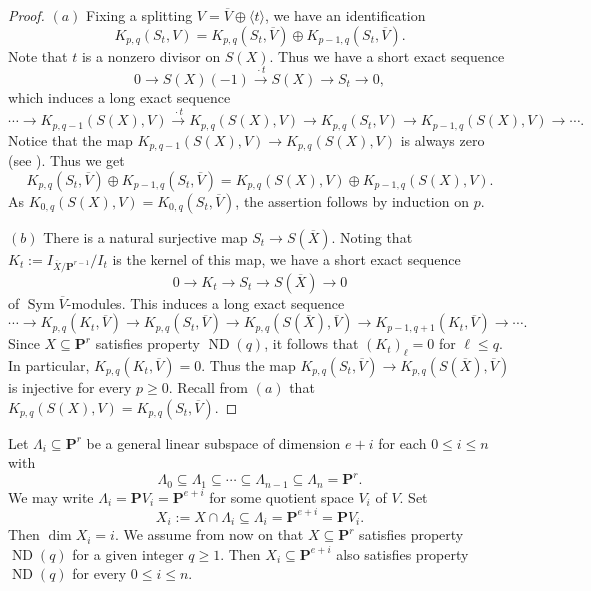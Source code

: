 \documentclass[12pt]{amsart}
\theoremstyle{definition}
\theoremstyle{remark}
\theoremstyle{corollary}
\theoremstyle{theorem}
\theoremstyle{corollary}
\theoremstyle{corollary}
\theoremstyle{definition}
\theoremstyle{remark}
\numberwithin{equation}{section}
\def\nP{\mathbf{P}}
\def\Sym{\operatorname{Sym}}
\DeclareMathOperator{\ND}{ND}
\begin{document}
\begin{proof}
$(a)$ Fixing a splitting $V = \overline{V} \oplus \langle t \rangle$, we have an identification
$$
K_{p,q}(S_t, V) = K_{p,q}(S_t, \overline{V}) \oplus K_{p-1,q}(S_t, \overline{V}).
$$
Note that $t$ is a nonzero divisor on $S(X)$. Thus we have a short exact sequence
$$
0 \longrightarrow S(X)(-1) \xrightarrow{~\cdot t~} S(X) \longrightarrow S_t \longrightarrow 0,
$$
which induces a long exact sequence
$$
\cdots \longrightarrow K_{p,q-1}(S(X), V) \xrightarrow{~\cdot t~} K_{p,q}(S(X), V) \longrightarrow K_{p,q}(S_t, V) \longrightarrow K_{p-1,q}(S(X), V) \longrightarrow \cdots.
$$
Notice that the map $K_{p,q-1}(S(X), V) \to K_{p,q}(S(X), V)$ is always zero (see \cite[Example 5.1.6]{EL}). Thus we get
$$
K_{p,q}(S_t, \overline{V}) \oplus K_{p-1,q}(S_t, \overline{V}) = K_{p,q}(S(X), V) \oplus K_{p-1,q}(S(X), V).
$$
As $K_{0,q}(S(X), V) = K_{0,q}(S_t, \overline{V})$, the assertion follows by induction on $p$.

\medskip

\noindent $(b)$ There is a natural surjective map $S_t \to S(\overline{X})$. Noting that $K_t:=I_{\overline{X}/\nP^{r-1}}/I_t$ is the kernel of this map, we have a short exact sequence
$$
0 \longrightarrow K_t \longrightarrow S_t \longrightarrow S(\overline{X}) \longrightarrow 0
$$
of $\Sym \overline{V}$-modules. This induces a long exact sequence
$$
\cdots \longrightarrow K_{p,q}(K_t, \overline{V}) \longrightarrow K_{p,q}(S_t, \overline{V}) \longrightarrow K_{p,q}(S(\overline{X}), \overline{V}) \longrightarrow K_{p-1,q+1}(K_t, \overline{V}) \longrightarrow \cdots.
$$
Since $X \subseteq \nP^r$ satisfies property $\ND(q)$, it follows that $(K_t)_\ell=0$ for $\ell \leq q$. In particular, $K_{p,q}(K_t, \overline{V}) = 0$. Thus the map $K_{p,q}(S_t, \overline{V}) \to K_{p,q}(S(\overline{X}), \overline{V})$ is injective for every $p \geq 0$. Recall from $(a)$ that $K_{p,q}(S(X), V) = K_{p,q}(S_t, \overline{V})$. 
\end{proof}

Let $\Lambda_i \subseteq \nP^r$ be a general linear subspace of dimension $e+i$ for each $0 \leq i \leq n$ with 
$$
\Lambda_0 \subseteq \Lambda_1 \subseteq \cdots \subseteq \Lambda_{n-1} \subseteq \Lambda_n = \nP^r.
$$
We may write $\Lambda_i = \nP V_i = \nP^{e+i}$ for some quotient space $V_i$ of $V$. Set 
$$
X_i:=X \cap \Lambda_i \subseteq \Lambda_i = \nP^{e+i} = \nP V_i.
$$
Then $\dim X_i = i$. We assume from now on that $X \subseteq \nP^r$ satisfies property $\ND(q)$ for a given integer $q \geq 1$. Then $X_i \subseteq \nP^{e+i}$ also satisfies property $\ND(q)$ for every $0 \leq i \leq n$. 
\end{document}
